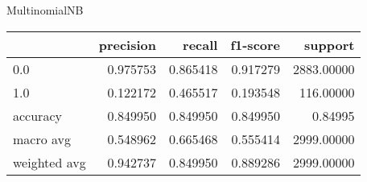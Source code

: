 MultinomialNB
\begin{tabular}{lrrrr}
\toprule
{} &  precision &    recall &  f1-score &     support \\
\midrule
0.0          &   0.975753 &  0.865418 &  0.917279 &  2883.00000 \\
1.0          &   0.122172 &  0.465517 &  0.193548 &   116.00000 \\
accuracy     &   0.849950 &  0.849950 &  0.849950 &     0.84995 \\
macro avg    &   0.548962 &  0.665468 &  0.555414 &  2999.00000 \\
weighted avg &   0.942737 &  0.849950 &  0.889286 &  2999.00000 \\
\bottomrule
\end{tabular}
